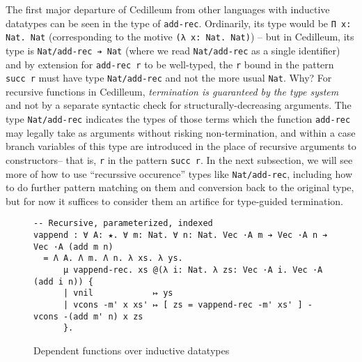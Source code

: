 \documentclass{article}
\newcommand{\vars}[1]{{\overline{#1}}}
\begin{document}
The first major departure of Cedilleum from other languages with inductive
datatypes can be seen in the type of \texttt{add-rec}. Ordinarily, its type
would be \verb;Π x: Nat. Nat; (corresponding to the motive
\verb;(λ x: Nat. Nat);) -- but in Cedilleum, its type is
\verb;Nat/add-rec ➔ Nat; (where we read \texttt{Nat/add-rec} as a single
identifier) and by extension for \texttt{add-rec r} to be well-typed, the
\texttt{r} bound in the pattern \texttt{succ r} must have type
\texttt{Nat/add-rec} and not the more usual \texttt{Nat}. Why? For recursive
functions in Cedilleum, \textit{termination is guaranteed by the type system}
and not by a separate syntactic check for structurally-decreasing arguments. The
type \texttt{Nat/add-rec} indicates the types of those terms which the function
\texttt{add-rec} may legally take as arguments without risking non-termination,
and within a case branch variables of this type are introduced in the place of
recursive arguments to constructors\footnotemark -- that is, \texttt{r} in the
pattern \texttt{succ r}. In the next subsection, we will see more of how to use
``recurssive occurence'' types like \texttt{Nat/add-rec}, including how to do
further pattern matching on them and conversion back to the original type, but
for now it suffices to consider them an artifice for type-guided termination.


\begin{figure}[h]
\begin{verbatim}
-- Recursive, parameterized, indexed
vappend : ∀ A: ★. ∀ m: Nat. ∀ n: Nat. Vec ·A m ➔ Vec ·A n ➔ Vec ·A (add m n)
  = Λ A. Λ m. Λ n. λ xs. λ ys.
      μ vappend-rec. xs @(λ i: Nat. λ zs: Vec ·A i. Vec ·A (add i n)) {
      | vnil            ↦ ys
      | vcons -m' x xs' ↦ [ zs = vappend-rec -m' xs' ] - vcons -(add m' n) x zs
      }.
\end{verbatim}
  \caption{Dependent functions over inductive datatypes}
  \label{fig:ex-data-dep}
\end{figure}
\end{document}
